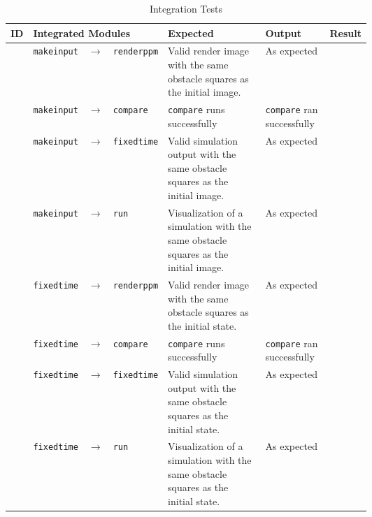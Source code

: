 
\newcommand{\integtest}[2]{\texttt{#1} & $\xrightarrow{}$ & \texttt{#2}}
\newcommand{\successoutput}[1]{#1 & As expected & \testsuccess{}}

\begin{sidewaystable}
    \centering
    \begin{tabular}{lccl|p{0.4\linewidth}|m{0.2\linewidth}|c}
        ID & \multicolumn{3}{l}{Integrated Modules} & Expected & Output & Result \\
        \hline
        \newtest{}\label{test:intg:input:render} & \integtest{makeinput}{renderppm} & \successoutput{Valid render image with the same obstacle squares as the initial image.} \\
        \newtest{}\label{test:intg:input:cmp} & \integtest{makeinput}{compare} & \texttt{compare} runs successfully & \texttt{compare} ran successfully & \testsuccess{} \\
        \newtest{}\label{test:intg:input:sim} & \integtest{makeinput}{fixedtime} & \successoutput{Valid simulation output with the same obstacle squares as the initial image.} \\
        \newtest{}\label{test:intg:input:viz} & \integtest{makeinput}{run} & \successoutput{Visualization of a simulation with the same obstacle squares as the initial image.} \\
        \hline
        \newtest{}\label{test:intg:sim:render} & \integtest{fixedtime}{renderppm} & \successoutput{Valid render image with the same obstacle squares as the initial state.} \\
        \newtest{}\label{test:intg:sim:cmp} & \integtest{fixedtime}{compare} & \texttt{compare} runs successfully & \texttt{compare} ran successfully & \testsuccess{} \\
        \newtest{}\label{test:intg:sim:sim} & \integtest{fixedtime}{fixedtime} & \successoutput{Valid simulation output with the same obstacle squares as the initial state.} \\
        \newtest{}\label{test:intg:sim:viz} & \integtest{fixedtime}{run} & \successoutput{Visualization of a simulation with the same obstacle squares as the initial state.} \\
    \end{tabular}
    \caption{Integration Tests}
    \label{tab:integration_tests}
\end{sidewaystable}
